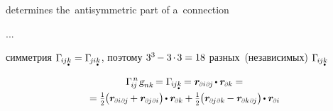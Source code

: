 \begin{otherlanguage}{russian}
\noindent
determines the~antisymmetric part of a~connection

...

\noindent
симметрия ${ \Gamma_{\hspace{-0.25ex}i\hspace{-0.1ex}j\mathdotbelow{k}} = \Gamma_{\hspace{-0.33ex}j\hspace{-0.06ex}i\mathdotbelow{k}} }$, поэтому ${3^3 \hspace{-0.2ex} - 3 \hspace{-0.2ex}\cdot\hspace{-0.2ex} 3 = 18}$ разных~(независимых) ${\Gamma_{\hspace{-0.25ex}i\hspace{-0.1ex}j\mathdotbelow{k}}}$

\begin{multline}
\Gamma_{\hspace{-0.25ex}i\hspace{-0.1ex}j}^{\hspace{.25ex}n} \hspace{.16ex} \textsl{g}_{nk} \hspace{-0.24ex} = \Gamma_{\hspace{-0.25ex}i\hspace{-0.1ex}j\mathdotbelow{k}} \hspace{-0.2ex} = \locationvector_{\differentialindex{i}\hspace{.2ex}\differentialindex{\hspace{-0.1ex}j}} \hspace{-0.2ex} \dotp \locationvector_\differentialindex{k} \hspace{-0.1ex} =
\\[-0.1em]
%
= \smallerdisplaystyleonehalf \hspace{-0.1ex} \bigl( \locationvector_{\differentialindex{i}\hspace{.2ex}\differentialindex{\hspace{-0.1ex}j}} \hspace{-0.16ex} + \locationvector_{\differentialindex{\hspace{-0.1ex}j}\hspace{.2ex}\differentialindex{i}} \bigr) \hspace{-0.2ex} \dotp \locationvector_\differentialindex{k} \hspace{-0.1ex}
+ \smallerdisplaystyleonehalf \hspace{-0.1ex} \bigl( \locationvector_{\differentialindex{\hspace{-0.1ex}j}\hspace{.2ex}\differentialindex{k}} \hspace{-0.16ex} - \locationvector_{\differentialindex{k}\hspace{.2ex}\differentialindex{\hspace{-0.1ex}j}} \bigr) \hspace{-0.2ex} \dotp \locationvector_\differentialindex{i} \hspace{-0.1ex}

\end{multline}
\end{otherlanguage}
